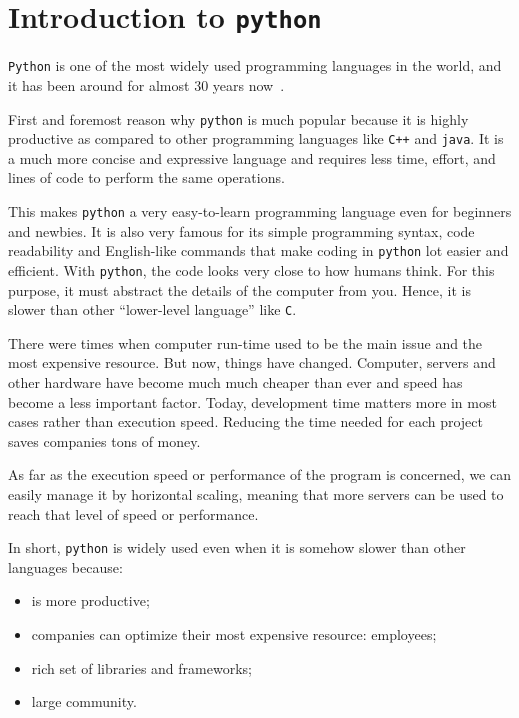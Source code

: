 \chapter{Introduction to \texttt{python}}
\label{introduction-to-python}

\texttt{Python} is one of the most widely used programming languages in the world, and it has been around for almost 30 years now~\cite{survey2019}.

First and foremost reason why \texttt{python} is much popular because it is highly productive as compared to other programming languages like \texttt{C++} and \texttt{java}. It is a much more concise and expressive language and requires less time, effort, and lines of code to perform the same operations.

This makes \texttt{python} a very easy-to-learn programming language even for beginners and newbies. It is also very famous for its simple programming syntax, code readability and English-like commands that make coding in \texttt{python} lot easier and efficient.
With \texttt{python}, the code looks very close to how humans think. For this purpose, it must abstract the details of the computer from you. Hence, it is slower than other “lower-level language” like \texttt{C}.

There were times when computer run-time used to be the main issue and the most expensive resource. But now, things have changed. Computer, servers and other hardware have become much much cheaper than ever and speed has become a less important factor. Today, development time matters more in most cases rather than execution speed. Reducing the time needed for each project saves companies tons of money.

As far as the execution speed or performance of the program is concerned, we can easily manage it by horizontal scaling, meaning that more servers can be used to reach that level of speed or performance.

In short, \texttt{python} is widely used even when it is somehow slower than other languages because:
\begin{itemize}
	\tightlist
  \item is more productive;
  \item companies can optimize their most expensive resource: employees;
  \item rich set of libraries and frameworks;
  \item large community.
\end{itemize}


